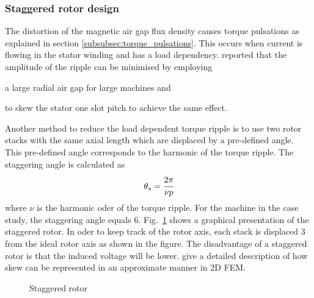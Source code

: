 \subsubsection{Staggered rotor design}\label{subsubsec:staggered_rotor}
The distortion of the magnetic air gap flux density causes torque pulsations as explained in section \ref{subsubsec:torque_pulsations}. This occurs when current is flowing in the stator winding and has a load dependency. \cite{Williamson1995} reported that the amplitude of the ripple can be minimised by employing
\begin{itemize*}
	\item a large radial air gap for large machines and
	\item to skew the stator one slot pitch to achieve the same effect.   
\end{itemize*}
Another method to reduce the load dependent torque ripple is to use two rotor stacks with the same axial length which are displaced by a pre-defined angle. This pre-defined angle corresponds to the harmonic of the torque ripple. The staggering angle is calculated as 
\begin{equation}
  \label{eqn:stagger_angle}
  \theta_s = \cfrac{2\pi}{\nu p}
\end{equation}   
where $\nu$ is the harmonic oder of the torque ripple. For the machine in the case study, the staggering angle equals \SI{6}{\arcdeg}. Fig.~\ref{fig:f_staggered} shows a graphical presentation of the staggered rotor. In oder to keep track of the rotor axis, each stack is displaced \SI{3}{\arcdeg} from the ideal rotor axis as shown in the figure. The disadvantage of a staggered rotor is that the induced voltage will be lower. \cite{Williamson1995a} give a detailed description of how skew can be represented in an approximate manner in 2D FEM.  
\begin{figure}
	\centering
	
	\caption{Staggered rotor}
	\label{fig:f_staggered}
\end{figure}
  

